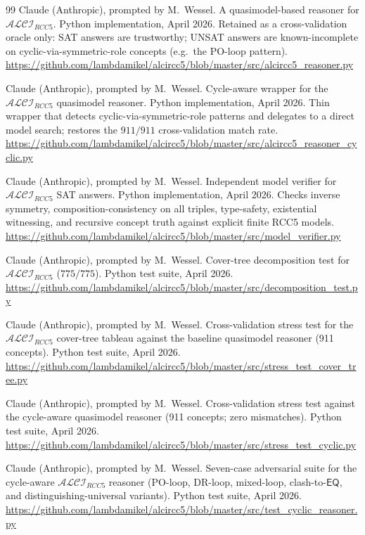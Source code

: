 \documentclass[
]{ceurart}
\theoremstyle{definition}
\newcommand{\ALCIRCC}[1]{\ensuremath{\mathcal{ALCI}_{\mathit{RCC#1}}}}
\newcommand{\EQ}{\ensuremath{\mathsf{EQ}}}
\begin{document}
\begin{thebibliography}{99}
Claude (Anthropic), prompted by M.\ Wessel.
\newblock A quasimodel-based reasoner for $\ALCIRCC{5}$.
\newblock Python implementation, April 2026.
\newblock Retained as a cross-validation oracle only: SAT answers
  are trustworthy; UNSAT answers are known-incomplete on
  cyclic-via-symmetric-role concepts (e.g.\ the PO-loop pattern).
\newblock \url{https://github.com/lambdamikel/alcircc5/blob/master/src/alcircc5_reasoner.py}

Claude (Anthropic), prompted by M.\ Wessel.
\newblock Cycle-aware wrapper for the $\ALCIRCC{5}$ quasimodel
  reasoner.
\newblock Python implementation, April 2026.
\newblock Thin wrapper that detects cyclic-via-symmetric-role
  patterns and delegates to a direct model search; restores the
  $911/911$ cross-validation match rate.
\newblock \url{https://github.com/lambdamikel/alcircc5/blob/master/src/alcircc5_reasoner_cyclic.py}

Claude (Anthropic), prompted by M.\ Wessel.
\newblock Independent model verifier for $\ALCIRCC{5}$ SAT answers.
\newblock Python implementation, April 2026.
\newblock Checks inverse symmetry, composition-consistency on all
  triples, type-safety, existential witnessing, and recursive
  concept truth against explicit finite RCC5 models.
\newblock \url{https://github.com/lambdamikel/alcircc5/blob/master/src/model_verifier.py}

Claude (Anthropic), prompted by M.\ Wessel.
\newblock Cover-tree decomposition test for $\ALCIRCC{5}$
  ($775/775$).
\newblock Python test suite, April 2026.
\newblock \url{https://github.com/lambdamikel/alcircc5/blob/master/src/decomposition_test.py}

Claude (Anthropic), prompted by M.\ Wessel.
\newblock Cross-validation stress test for the $\ALCIRCC{5}$
  cover-tree tableau against the baseline quasimodel reasoner
  (911 concepts).
\newblock Python test suite, April 2026.
\newblock \url{https://github.com/lambdamikel/alcircc5/blob/master/src/stress_test_cover_tree.py}

Claude (Anthropic), prompted by M.\ Wessel.
\newblock Cross-validation stress test against the cycle-aware
  quasimodel reasoner (911 concepts; zero mismatches).
\newblock Python test suite, April 2026.
\newblock \url{https://github.com/lambdamikel/alcircc5/blob/master/src/stress_test_cyclic.py}

Claude (Anthropic), prompted by M.\ Wessel.
\newblock Seven-case adversarial suite for the cycle-aware
  $\ALCIRCC{5}$ reasoner (PO-loop, DR-loop, mixed-loop,
  clash-to-$\EQ$, and distinguishing-universal variants).
\newblock Python test suite, April 2026.
\newblock \url{https://github.com/lambdamikel/alcircc5/blob/master/src/test_cyclic_reasoner.py}


\end{thebibliography}
\end{document}
